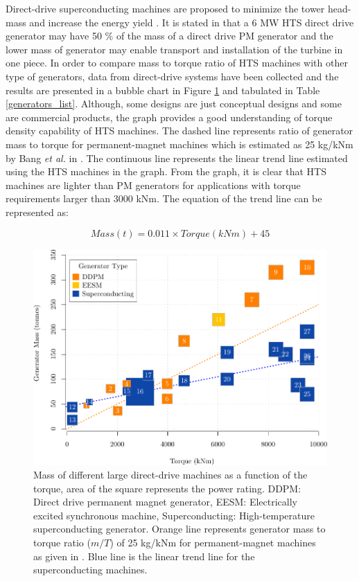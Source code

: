 \documentclass[12pt]{iopart}
\begin{document}
Direct-drive superconducting machines are proposed to minimize the tower head-mass and increase the energy yield \cite{Lesser2009, Lewis2007, Kalsi2004a}. It is stated in \cite{Lewis2007} that a 6 MW HTS direct drive generator may have 50 \% of the mass of a direct drive PM generator and the lower mass of generator may enable transport and installation of the turbine in one piece.
In order to compare mass to torque ratio of HTS machines with other type of generators, data from direct-drive systems have been collected and the results are presented in a bubble chart in Figure \ref{generators_mass_comparison} and tabulated in Table \ref{generators_list}. Although, some designs are just conceptual designs and some are commercial products, the graph provides a good understanding of torque density capability of HTS machines.  The dashed line represents ratio of generator mass to torque for permanent-magnet machines which is estimated as 25 kg/kNm by Bang \textit{et al.} in \cite{Bang2008}. The continuous line represents the linear trend line estimated using the HTS machines in the graph. From the graph, it is clear that HTS machines are lighter than PM generators for applications with torque requirements larger than 3000 kNm. The equation of the trend line can be represented as:

 \begin{equation}
     Mass(t)=0.011\times Torque(kNm)+45
     \label{mass_torque_eq}
 \end{equation}

\begin{figure}[]
\centering
\includegraphics[]{generator_mass_compare}
\caption{Mass of different large direct-drive machines as a function of the torque, area of the square represents the power rating.
 DDPM: Direct drive permanent magnet generator, EESM: Electrically excited synchronous machine, Superconducting: High-temperature superconducting generator. Orange line represents generator mass to torque ratio ($m/T$) of 25 kg/kNm for permanent-magnet machines as given in \cite{Bang2008}. Blue line is the linear trend line for the superconducting machines.}
\label{generators_mass_comparison}
\end{figure}
\end{document}
